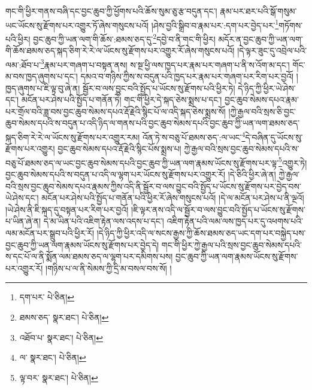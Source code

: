 གང་གི་ཕྱིར་གནས་བཞི་དང་བྱང་ཆུབ་ཀྱི་ཕྱོགས་པའི་ཆོས་སུམ་ཅུ་རྩ་བདུན་དང་། རྣམ་པར་ཐར་པའི་སྒོ་གསུམ་ཡང་ཡོངས་སུ་རྫོགས་པར་འགྱུར་ཏོ་ཞེས་གསུངས་པའོ། །ཤེས་བྱའི་སྒྲིབ་བ་རྣམ་པར་:དག་པར་བྱེད་པར་\footnote{དག་པར་  པེ་ཅིན། }གཏོགས་པའི་ཕྱིར། བྱང་ཆུབ་ཀྱི་ཡན་ལག་གི་ཆོས་:ཐམས་ཅད་དུ་\footnote{ཐམས་ཅད་  སྣར་ཐང་།  པེ་ཅིན། }དབྱེ་བ་ནི་གང་གི་ཕྱིར། མདོར་ན་བྱང་ཆུབ་ཀྱི་ཡན་ལག་གི་ཆོས་ཐམས་ཅད་སྐད་ཅིག་རེ་རེ་ལ་ཡོངས་སུ་རྫོགས་པར་འགྱུར་རོ་ཞེས་གསུངས་པའོ། །དེ་ལྟར་ཟུང་དུ་འབྲེལ་པའི་ལམ་:ཐོབ་པ་\footnote{འཐོབ་པ་  སྣར་ཐང་།  པེ་ཅིན། }རྣམ་པར་གཞག་པ་བསྟན་ནས། ས་སྔ་ཕྱི་ལས་ཁྱད་པར་རྣམ་པར་གཞག་པ་ནི་ས་འོག་མ་དང་། གོང་མ་བས་ཁྱད་ཞུགས་པ་དང་། དམའ་བ་གཉིས་ཀྱིས་ས་བདུན་པའི་ཁྱད་པར་རྣམ་པར་གཞག་པར་རིག་པར་བྱའོ། །ཁྱད་ཞུགས་པ་ཇི་ལྟ་བུ་ཞེ་ན། སྦྱོར་བ་ལས་བྱུང་བའི་སྤྱོད་པ་ཡོངས་སུ་རྫོགས་པའི་ཕྱིར་ཏེ། དེ་ཉིད་ཀྱི་ཕྱིར་ཡེ་ཤེས་དང་། མངོན་པར་ཤེས་པའི་སྤྱོད་པ་གནོན་ཏེ། གང་གི་ཕྱིར་དེ་སྐད་ཅེས་སྨྲས་པ་དང་། བྱང་ཆུབ་སེམས་དཔའ་རྣམ་པར་གྲོལ་བའི་ཟླ་བས་བྱང་ཆུབ་སེམས་དཔའ་རྡོ་རྗེའི་སྙིང་པོ་ལ་འདི་སྐད་ཅེས་སྨྲས་སོ། །ཀྱེ་རྒྱལ་བའི་སྲས་ཅི་བྱང་ཆུབ་སེམས་དཔའི་ས་བདུན་པ་འདི་ཉིད་ལ་གནས་པའི་བྱང་ཆུབ་སེམས་དཔའི་བྱང་ཆུབ་ཀྱི་ཡན་ལག་ཐམས་ཅད་སྐད་ཅིག་རེ་རེ་ལ་ཡོངས་སུ་རྫོགས་པར་འགྱུར་རམ། འོན་ཏེ་ས་བཅུ་པོ་ཐམས་ཅད་:ལ་ཡང་\footnote{ལ་  སྣར་ཐང་།  པེ་ཅིན། }དེ་བཞིན་དུ་ཡོངས་སུ་རྫོགས་པར་འགྱུར། བྱང་ཆུབ་སེམས་དཔའ་རྡོ་རྗེའི་སྙིང་པོས་སྨྲས་པ། ཀྱེ་རྒྱལ་བའི་སྲས་བྱང་ཆུབ་སེམས་དཔའི་ས་བཅུ་པོ་ཐམས་ཅད་ལ་ཡང་བྱང་ཆུབ་སེམས་དཔའི་བྱང་ཆུབ་ཀྱི་ཡན་ལག་རྣམས་ཡོངས་སུ་རྫོགས་པར་ལྟ་\footnote{ལྟ་བར་  སྣར་ཐང་།  པེ་ཅིན། }འགྱུར་ཏེ། བྱང་ཆུབ་སེམས་དཔའི་ས་བདུན་པ་འདི་ལ་ལྷག་པར་ཡོངས་སུ་རྫོགས་པར་འགྱུར་རོ། །དེ་ཅིའི་ཕྱིར་ཞེ་ན། ཀྱེ་རྒྱལ་བའི་སྲས་བྱང་ཆུབ་སེམས་དཔའ་རྣམས་ཀྱིས་འདི་ནི་སྦྱོར་བ་ལས་བྱུང་བའི་སྤྱོད་པ་ཡོངས་སུ་རྫོགས་པར་བྱེད་བས་ཡེ་ཤེས་དང་། མངོན་པར་ཤེས་པའི་སྤྱོད་པ་གནོན་པའི་ཕྱིར་རོ་ཞེས་གསུངས་པའོ། །དེ་ལ་མངོན་པར་ཤེས་པ་ནི་ལྔའོ། །ཡེ་ཤེས་ནི་ཇི་སྐད་དུ་བསྟན་པར་རིག་པར་བྱའོ། །ཇི་ལྟར་ནས་འདི་ལ་སྦྱོར་བ་ལས་བྱུང་བའི་སྤྱོད་པ་ཡོངས་སུ་རྫོགས་པ་ཡིན་ཞེ་ན། དེ་མ་ཡིན་པའི་འཇིག་རྟེན་ལས་འདས་པ་དང་། འཇིག་རྟེན་པའི་ལམ་ལས་ཁྱད་པར་དུ་འཕགས་པའི་ལམ་མངོན་པར་སྒྲུབ་པའི་ཕྱིར་རོ། །དེ་ཉིད་ཀྱི་ཕྱིར་འདི་ལ་སངས་རྒྱས་ཀྱི་ཆོས་ཐམས་ཅད་ཡང་དག་པར་བསྐྱེད་པས་བྱང་ཆུབ་ཀྱི་ཡན་ལག་རྣམས་ཡོངས་སུ་རྫོགས་པར་བྱེད་དེ། གང་གི་ཕྱིར་ཀྱེ་རྒྱལ་པའི་སྲས་བྱང་ཆུབ་སེམས་དཔའི་ས་དང་པོ་ལ་ནི་སྨོན་ལམ་ཐམས་ཅད་ལ་ལྷག་པར་དམིགས་པས། བྱང་ཆུབ་ཀྱི་ཡན་ལག་རྣམས་ཡོངས་སུ་རྫོགས་པར་འགྱུར་རོ། །གཉིས་པ་ལ་ནི་སེམས་ཀྱི་དྲི་མ་བསལ་བས་སོ། །
